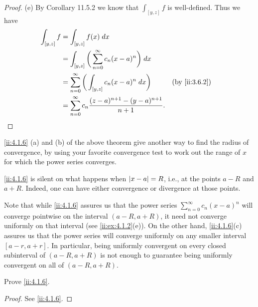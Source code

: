 \begin{proof}{(e)}
  By Corollary 11.5.2 we know that \(\int_{[y, z]} f\) is well-defined.
  Thus we have
  \begin{align*}
    \int_{[y, z]} f & = \int_{[y, z]} f(x) \; dx                                                                     \\
                    & = \int_{[y, z]} \bigg(\sum_{n = 0}^\infty c_n (x - a)^n\bigg) \; dx                            \\
                    & = \sum_{n = 0}^\infty \bigg(\int_{[y, z]} c_n (x - a)^n \; dx\bigg)         &  & \by{ii:3.6.2} \\
                    & = \sum_{n = 0}^\infty c_n \dfrac{(z - a)^{n + 1} - (y - a)^{n + 1}}{n + 1}.
  \end{align*}
\end{proof}

\begin{note}
  \cref{ii:4.1.6} (a) and (b) of the above theorem give another way to find the radius of convergence, by using your favorite convergence test to work out the range of \(x\) for which the power series converges.
\end{note}

\setcounter{thm}{7}
\begin{rmk}\label{ii:4.1.8}
  \cref{ii:4.1.6} is silent on what happens when \(\left\lvert x - a\right\rvert = R\), i.e., at the points \(a - R\) and \(a + R\).
  Indeed, one can have either convergence or divergence at those points.
\end{rmk}

\begin{rmk}\label{ii:4.1.9}
  Note that while \cref{ii:4.1.6} assures us that the power series \(\sum_{n = 0}^\infty c_n (x - a)^n\) will converge pointwise on the interval \((a - R, a + R)\), it need not converge uniformly on that interval
  (see \cref{ii:ex:4.1.2}(e)).
  On the other hand, \cref{ii:4.1.6}(c) assures us that the power series will converge uniformly on any smaller interval \([a - r, a + r]\).
  In particular, being uniformly convergent on every closed subinterval of \((a - R, a + R)\) is not enough to guarantee being uniformly convergent on all of \((a - R, a + R)\).
\end{rmk}

\exercisesection

\begin{ex}\label{ii:ex:4.1.1}
  Prove \cref{ii:4.1.6}.
\end{ex}

\begin{proof}
  See \cref{ii:4.1.6}.
\end{proof}

